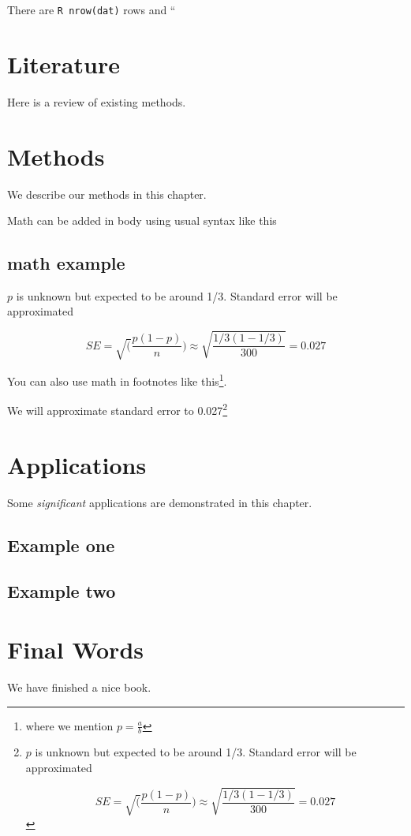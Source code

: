\documentclass[
]{book}
\begin{document}
There are \texttt{R\ nrow(dat)} rows and ``

\hypertarget{literature}{%
\chapter{Literature}\label{literature}}

Here is a review of existing methods.

\hypertarget{methods}{%
\chapter{Methods}\label{methods}}

We describe our methods in this chapter.

Math can be added in body using usual syntax like this

\hypertarget{math-example}{%
\section{math example}\label{math-example}}

\(p\) is unknown but expected to be around 1/3. Standard error will be approximated

\[
SE = \sqrt(\frac{p(1-p)}{n}) \approx \sqrt{\frac{1/3 (1 - 1/3)} {300}} = 0.027
\]

You can also use math in footnotes like this\footnote{where we mention \(p = \frac{a}{b}\)}.

We will approximate standard error to 0.027\footnote{\(p\) is unknown but expected to be around 1/3. Standard error will be approximated

  \[
  SE = \sqrt(\frac{p(1-p)}{n}) \approx \sqrt{\frac{1/3 (1 - 1/3)} {300}} = 0.027
  \]}

\hypertarget{applications}{%
\chapter{Applications}\label{applications}}

Some \emph{significant} applications are demonstrated in this chapter.

\hypertarget{example-one}{%
\section{Example one}\label{example-one}}

\hypertarget{example-two}{%
\section{Example two}\label{example-two}}

\hypertarget{final-words}{%
\chapter{Final Words}\label{final-words}}

We have finished a nice book.

  
\end{document}
